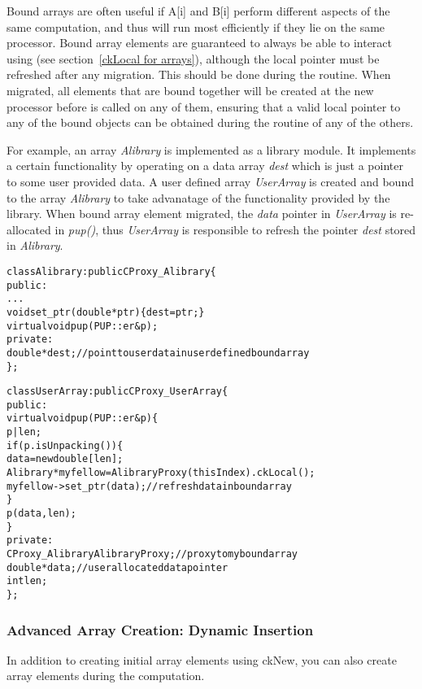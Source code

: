 Bound arrays are often useful if A[i] and B[i] perform different 
aspects of the same computation, and thus will run most efficiently 
if they lie on the same processor.  Bound array elements are guaranteed
to always be able to interact using  (see 
section~\ref{ckLocal for arrays}), although the local pointer must
be refreshed after any migration. This should be done during the 
routine. When migrated, all elements that are bound together will be created
at the new processor before  is called on any of them, ensuring that
a valid local pointer to any of the bound objects can be obtained during the
 routine of any of the others.

For example, an array {\it Alibrary} is implemented as a library module.
It implements a certain functionality by operating on a data array {\it dest}
which is just a pointer to some user provided data.
A user defined array {\it UserArray} is created and bound to 
the array {\it Alibrary} to take advanatage of the functionality provided 
by the library.
When bound array element migrated, the {\it data} pointer in {\it UserArray}
is re-allocated in {\it pup()}, thus {\it UserArray} is responsible to refresh
the pointer {\it dest} stored in {\it Alibrary}.

\begin{alltt}
class Alibrary: public CProxy_Alibrary \{
public:
  ...
  void set_ptr(double *ptr) \{ dest = ptr; \}
  virtual void pup(PUP::er &p);
private:
  double *dest;           // point to user data in user defined bound array
\};

class UserArray: public CProxy_UserArray \{
public:
  virtual void pup(PUP::er &p) \{
                p|len;
                if(p.isUnpacking()) \{ 
                  data = new double[len];
                  Alibrary *myfellow = AlibraryProxy(thisIndex).ckLocal();
                  myfellow->set_ptr(data);    // refresh data in bound array
                \}
                p(data, len);
  \}
private:
  CProxy_Alibrary  AlibraryProxy;   // proxy to my bound array
  double *data;          // user allocated data pointer
  int len;
\};
\end{alltt}


\subsubsection{Advanced Array Creation: Dynamic Insertion}

\label{dynamic_insertion}

In addition to creating initial array elements using ckNew,
you can also
create array elements during the computation.

